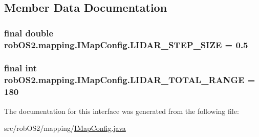 \subsection{Member Data Documentation}
\hypertarget{interfacerob_o_s2_1_1mapping_1_1_i_map_config_a37623bad1f37c915845c510b1d54a40b}{
\subsubsection[{LIDAR\_\-STEP\_\-SIZE}]{\setlength{\rightskip}{0pt plus 5cm}final double {\bf robOS2.mapping.IMapConfig.LIDAR\_\-STEP\_\-SIZE} = 0.5}}
\label{interfacerob_o_s2_1_1mapping_1_1_i_map_config_a37623bad1f37c915845c510b1d54a40b}
\hypertarget{interfacerob_o_s2_1_1mapping_1_1_i_map_config_aac55d698a7eb94f9856a6ea5456bbfb0}{
\subsubsection[{LIDAR\_\-TOTAL\_\-RANGE}]{\setlength{\rightskip}{0pt plus 5cm}final int {\bf robOS2.mapping.IMapConfig.LIDAR\_\-TOTAL\_\-RANGE} = 180}}
\label{interfacerob_o_s2_1_1mapping_1_1_i_map_config_aac55d698a7eb94f9856a6ea5456bbfb0}


The documentation for this interface was generated from the following file:\begin{DoxyCompactItemize}
\item 
src/robOS2/mapping/\hyperlink{_i_map_config_8java}{IMapConfig.java}\end{DoxyCompactItemize}
